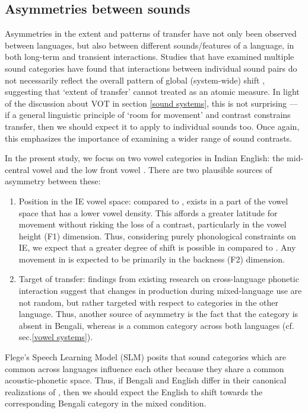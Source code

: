 \documentclass[12 pt]{article}
\newcommand{\nt}[1]{\textipa{[#1]}} %
\begin{document}
\subsection{Asymmetries between sounds}\label{asymmetry between sounds}

Asymmetries in the extent and patterns of transfer have not only been observed between languages, but also between different sounds/features of a language, in both long-term and transient interactions. Studies that have examined multiple sound categories have found that interactions between individual sound pairs do not necessarily reflect the overall pattern of global (system-wide) shift \citep[e.g.][vowel quality]{chang2012rapid,elias2017effects}, suggesting that `extent of transfer' cannot treated as an atomic measure. In light of the discussion about VOT in section \ref{sound systems}, this is not surprising --- if a general linguistic principle of `room for movement' and contrast constrains transfer, then we should expect it to apply to individual sounds too. Once again, this emphasizes the importance of examining a wider range of sound contrasts.


In the present study, we focus on two vowel categories in Indian English: the mid-central vowel \nt{2} and the low front vowel \nt{\ae}. There are two plausible sources of asymmetry between these:
\begin{enumerate}
	\item Position in the IE vowel space: compared to \nt{\ae}, \nt{2} exists in a part of the vowel space that has a lower vowel density. This affords a greater latitude for movement without risking the loss of a contrast, particularly in the vowel height (F1) dimension. Thus, considering purely phonological constraints on IE, we expect that a greater degree of shift is possible in \nt{2} compared to \nt{\ae}. Any movement in \nt{\ae} is expected to be primarily in the backness (F2) dimension.
	\item Target of transfer: findings from existing research on cross-language phonetic interaction suggest that changes in production during mixed-language use are not random, but rather targeted with respect to categories in the other language. Thus, another source of asymmetry is the fact that the category \nt{2} is absent in Bengali, whereas \nt{\ae} is a common category across both languages (cf. sec.\ref{vowel systems}).
\end{enumerate}


Flege's Speech Learning Model (SLM) \citeyearpar{flege1995second,flege2007language} posits that sound categories which are common across languages influence each other because they share a common acoustic-phonetic space. Thus, if Bengali and English differ in their canonical realizations of \nt{\ae}, then we should expect the English \nt{\ae} to shift towards the corresponding Bengali category in the mixed condition. 
\end{document}
